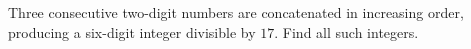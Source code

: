 Three consecutive two-digit numbers are concatenated in increasing order, producing a six-digit integer divisible by $17$. Find all such integers.
